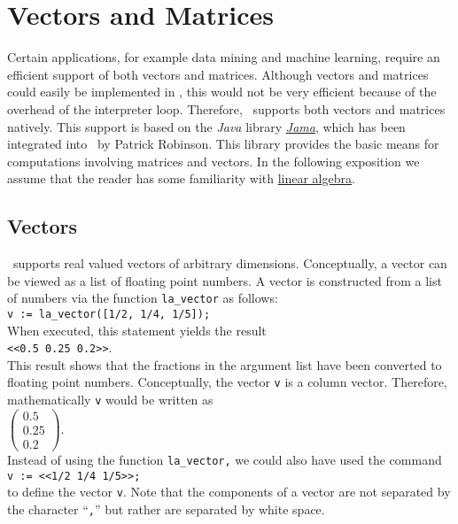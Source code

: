 \chapter{Vectors and Matrices \label{chapter:linear-algebra.tex}}
Certain applications, for example data mining and machine learning, require an efficient support of both
vectors and matrices. 
Although vectors and matrices could easily be implemented in \setlx, this would not be very
efficient because of the overhead of the interpreter loop.  Therefore, \setlx\ supports both vectors and
matrices natively.  This support is based on the \textsl{Java} library 
\href{http://math.nist.gov/javanumerics/jama/}{\textsl{Jama}}, which has been integrated into
\setlx\ by Patrick Robinson.  This library provides the basic means for computations involving
matrices and vectors.  In the following exposition we assume that the reader has some familiarity with  
\href{http://en.wikipedia.org/wiki/Linear_algebra}{linear algebra}.

\section{Vectors}
\setlx\ supports real valued vectors of arbitrary dimensions.  Conceptually, a vector can be viewed as
a list of floating point numbers.  A vector is constructed from a list of numbers via the
function \texttt{la\_vector} as follows:
\\[0.2cm]
\hspace*{1.3cm}
\texttt{v := la\_vector([1/2, 1/4, 1/5]);}
\\[0.2cm]
When executed, this statement yields the result
\\[0.2cm]
\hspace*{1.3cm}
\texttt{<<0.5 0.25 0.2>>}.
\\[0.2cm]
This result shows that the fractions in the argument list have been converted to floating point
numbers.  Conceptually, the vector \texttt{v} is a column vector.  Therefore, mathematically
\texttt{v} would be written as
\\[0.2cm]
\hspace*{1.3cm}
$
\left(\begin{array}{l}
  0.5  \\
  0.25 \\
  0.2
\end{array}\right)
$.
\\[0.2cm]
Instead of using the function \texttt{la\_vector,} we could also have used the command
\\[0.2cm]
\hspace*{1.3cm}
\texttt{v := <<1/2 1/4 1/5>>;}
\\[0.2cm]
to define the vector \texttt{v}.  Note that the components of a vector are not separated by the
character ``\texttt{,}'' but rather are separated by white space.


